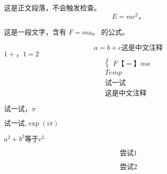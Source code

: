 \documentclass{article}
\begin{document}
这是正文段落，不会触发检查。
\begin{equation}
E = mc^2，
\end{equation}

这是一段文字，含有 $F = ma。$ 的公式。

\[
    a = b + c \text{这是中文注释}
\]
\(1+，1=2\)
\begin{equation*}
    \begin{cases}
        F【=】ma
    \end{cases}
\end{equation*}
\begin{equation*}
    \begin{aligned}
        Temp&\\
        试一试&\\
        \text{这是中文注释}
    \end{aligned}
\end{equation*}

$试一试，\pi$

$\text{试一试,}\exp(\mathrm{i}\pi)$

\(a^2+b^2等于c^2\)

\[尝试1
\]

\[
尝试2\]
\end{document}
